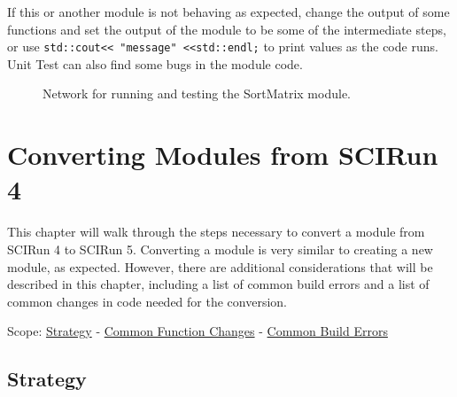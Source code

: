 \documentclass[fleqn,11pt,openany]{book}
\begin{document}
If this or another module is not behaving as expected, change the output of some functions and set the output of the module to be some of the intermediate steps, or use \verb|std::cout<< "message" <<std::endl;| to print values as the code runs.  
Unit Test can also find some bugs in the module code.  


\begin{figure}[H]
\centerline{}
\caption{Network for running and testing the SortMatrix module.}
\label{fig:Testalg_net}
\end{figure}



\chapter{Converting Modules from SCIRun 4}
\label{sec:converting}

\begin{introduction}
This chapter will walk through the steps necessary to convert a module from SCIRun 4 to SCIRun 5.  
Converting a module is very similar to creating a new module, as expected.  
However, there are additional considerations that will be described in this chapter, including a list of common build errors and a list of common changes in code needed for the conversion.

Scope: \hyperref[sec:strategy]{Strategy} - \hyperref[sec:changes]{Common Function Changes} - \hyperref[sec:errors]{Common Build Errors}
\end{introduction}

\section{Strategy}
\label{sec:strategy}
\end{document}
